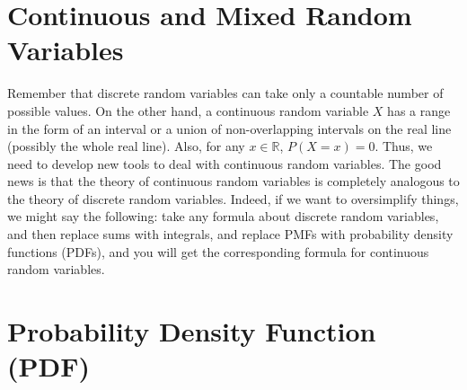 \section{Continuous and Mixed Random Variables}
Remember that discrete random variables can take only a countable number of possible values. On the other hand, a continuous random variable $X$ has a range in the form of an interval or a union of non-overlapping intervals on the real line (possibly the whole real line). Also, for any $x\in \mathbb{R}$, $P(X=x)=0$. Thus, we need to develop new tools to deal with continuous random variables. The good news is that the theory of continuous random variables is completely analogous to the theory of discrete random variables. Indeed, if we want to oversimplify things, we might say the following: take any formula about discrete random variables, and then replace sums with integrals, and replace PMFs with probability density functions (PDFs), and you will get the corresponding formula for continuous random variables. 

\section{Probability Density Function (PDF)}


